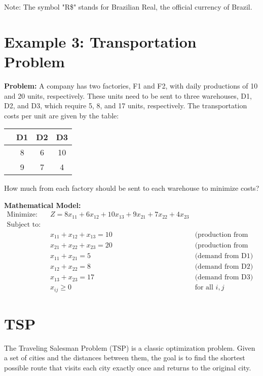 \documentclass[]{article}
\theoremstyle{definition}
\theoremstyle{definition}
\begin{document}
Note: The symbol "R\$" stands for Brazilian Real, the official currency of Brazil.





\section*{Example 3: Transportation Problem}

\textbf{Problem:} 
A company has two factories, F1 and F2, with daily productions of 10 and 20 units, respectively. These units need to be sent to three warehouses, D1, D2, and D3, which require 5, 8, and 17 units, respectively. The transportation costs per unit are given by the table:
\begin{center}
	\begin{tabular}{c|ccc}
		& D1 & D2 & D3 \\
		\hline
		\text{F1} & 8 & 6 & 10 \\
		\text{F2} & 9 & 7 & 4 \\
	\end{tabular}
\end{center}
How much from each factory should be sent to each warehouse to minimize costs?

\textbf{Mathematical Model:}
\begin{align*}
\text{Minimize:} \quad & Z = 8x_{11} + 6x_{12} + 10x_{13} + 9x_{21} + 7x_{22} + 4x_{23} \\
\text{Subject to:} \\
& x_{11} + x_{12} + x_{13} = 10 \quad & \text{(production from F1)} \\
& x_{21} + x_{22} + x_{23} = 20 \quad & \text{(production from F2)} \\
& x_{11} + x_{21} = 5 \quad & \text{(demand from D1)} \\
& x_{12} + x_{22} = 8 \quad & \text{(demand from D2)} \\
& x_{13} + x_{23} = 17 \quad & \text{(demand from D3)} \\
& x_{ij} \geq 0 \quad & \text{for all } i,j
\end{align*}

\section{TSP}

The Traveling Salesman Problem (TSP) is a classic optimization problem. Given a set of cities and the distances between them, the goal is to find the shortest possible route that visits each city exactly once and returns to the original city.
\end{document}
